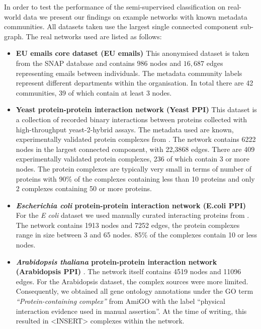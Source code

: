 \documentclass[sigconf]{acmart}
\begin{document}
In order to test the performance of the semi-supervised classification on real-world data we present our findings on example networks with known metadata communities.
All datasets taken use the largest single connected component sub-graph.
The real networks used are listed as follows:
\begin{itemize}
 \item \textbf{EU emails core dataset (EU emails) \cite{leskovec2007graph}} This anonymised dataset is taken from the SNAP database \cite{snapnets} and contains $986$ nodes and $16,687$ edges representing emails between individuals.
 The metadata community labels represent different departments within the organisation.
 In total there are 42 communities, 39 of which contain at least 3 nodes.
 
 \item \textbf{Yeast protein-protein interaction network (Yeast PPI)} \cite{yu2008high}
 This dataset is a collection of recorded binary interactions between proteins collected with high-throughput yeast-2-hybrid assays.
 The metadata used are known, experimentally validated protein complexes from \cite{pu2008up}.
 The network contains 6222 nodes in the largest connected component, with 22,3868 edges.
 There are 409 experimentally validated protein complexes, 236 of which contain 3 or more nodes.
 The protein complexes are typically very small in terms of number of proteins with  90\% of the complexes containing less than 10 proteins and only 2 complexes containing 50 or more proteins.

  \item \textbf{\textit{Escherichia coli} protein-protein interaction network (E.coli PPI) \cite{su2007bacteriome}}
  For the \textit{E coli} dataset we used manually curated interacting proteins from \cite{su2007bacteriome}.
  The network contains 1913 nodes and 7252 edges, the protein complexes range in size between 3 and 65 nodes.
  85\% of the complexes contain 10 or less nodes.
 
 \item \textbf{\textit{Arabidopsis thaliana} protein-protein interaction network (Arabidopsis PPI)} \cite{ArabidopsisConsortium2011}.
  The network itself contains 4519 nodes and 11096 edges.
  For the Arabidopsis dataset, the complex sources were more limited.
  Consequently, we obtained all gene ontology annotations under the GO term \textit{``Protein-containing complex''} from AmiGO \cite{carbon2009amigo} with the label ``physical interaction evidence used in manual assertion''.
  At the time of writing, this resulted in <INSERT> complexes within the network.
  
\end{itemize}
\end{document}

